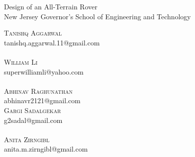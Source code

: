 \documentclass[12pt]{article}
\numberwithin{figure}{section}
\begin{document}
\begin{center}
\LARGE{Design of an All-Terrain Rover} \\
\normalsize{New Jersey Governor's School of Engineering and Technology}
\end{center}
\begin{multicols}{2}
\noindent \textsc{Tanishq Aggarwal} \\ tanishq.aggarwal.11@gmail.com \\
\\ \textsc{William Li} \\ superwilliamli@yahoo.com \\
\\ \textsc{Abhinav Raghunathan} \\ abhinavr2121@gmail.com
\columnbreak
\\ \textsc{Gargi Sadalgekar} \\ g2sadal@gmail.com \\ 
\\ \textsc{Anita Zirngibl} \\ anita.m.zirngibl@gmail.com 
\end{multicols}
\end{document}
